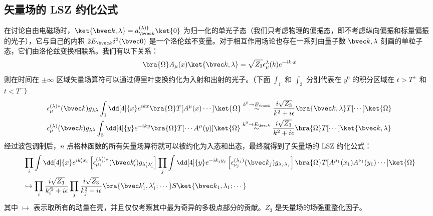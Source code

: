 \subsection{矢量场的 LSZ 约化公式}
在讨论自由电磁场时，$\ket{\bvec k,\lambda}=a_{\bvec k}^{(\lambda)\dagger}\ket{0}$ 为归一化的单光子态（我们只考虑物理的偏振态，即不考虑纵向偏振和标量偏振的光子），它与自己的内积 $2E_{\bvec k}\delta^3(\bvec 0)$ 是一个洛伦兹不变量。对于相互作用场论也存在一系列由量子数 $\bvec k,\lambda$ 刻画的单粒子态，它们由洛伦兹变换相联系。我们有以下关系：
\[
\bra{\Omega}A_\mu(x)\ket{\bvec k,\lambda}=\sqrt{Z_3}\epsilon_\mu^{\lambda}(k)e^{-ik\cdot x}
\]
则在时间在 $\pm \infty$ 区域矢量场算符可以通过傅里叶变换约化为入射和出射的光子。（下面 $\int_1$ 和 $\int_3$ 分别代表在 $y^0$ 的积分区域在 $t>T^+$ 和 $t<T^-$）
\begin{equation}
\begin{aligned}
&\epsilon_\mu^{(\lambda)*}(\bvec k)g_{\lambda\lambda}\int_{ 1} \dd[4]{x} e^{ikx} \bra{\Omega}T[A^\mu(x)\cdots]\ket{\Omega}
\stackrel{k^0\rightarrow E_{\bvec k}}{\sim}
\frac{i\sqrt{Z_3}}{k^2+i\epsilon} \bra{\bvec k,\lambda} T[\cdots]\ket{\Omega}
\\
&
\epsilon_\mu^{(\lambda)}(\bvec k)g_{\lambda\lambda}
\int_{3} \dd[4]{y} e^{-iky}
\bra{\Omega}T[\cdots A^\mu(y)]\ket{ \Omega}
\stackrel{k^0\rightarrow E_{\bvec k}}{\sim}
\frac{i\sqrt{Z_3}}{k^2+i\epsilon}\bra{\Omega} T[\cdots]\ket{\bvec k,\lambda}
\end{aligned}
\end{equation}
经过波包调制后，$n$ 点格林函数的所有矢量场算符就可以被约化为入态和出态，最终就得到了矢量场的 LSZ 约化公式：
\begin{equation}
\begin{aligned}
&\prod_{i}\int \dd[4]{x} e^{ik'_ix_i} 
\left[\epsilon_{\mu_i}^{(\lambda'_i)*}(\bvec k'_i)g_{\lambda'_i\lambda'_i}\right] 
\prod_{j}\int \dd[4]{y} e^{-ik_jy_j}  \left[\epsilon_{\nu_j}^{(\lambda_j)}(\bvec k_j) g_{\lambda_j\lambda_j}\right]
\bra{\Omega}T[A^{\mu_1}(x_1)A^{\nu_1}(y_1)\cdots]\ket{\Omega}
\\
&\mapsto \prod_i\frac{i\sqrt{Z_3}}{k_i'^2+i\epsilon}\prod_j \frac{i\sqrt{Z_3}}{k_j^2+i\epsilon}\bra{\bvec k'_1,\lambda'_1;\cdots}S\ket{\bvec k_1,\lambda_1;\cdots}
\end{aligned}
\end{equation}
其中 $\mapsto$ 表示取所有的动量在壳，并且仅仅考察其中最为奇异的多极点部分的贡献。$Z_3$ 是矢量场的场强重整化因子。

